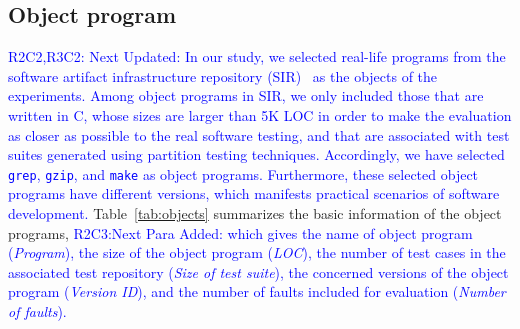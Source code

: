 \documentclass[10pt,journal,compsoc]{IEEEtran}
\begin{document}
\subsection{Object program}

\textcolor{blue}{R2C2,R3C2: Next Updated: In our study, we selected real-life programs from the software artifact infrastructure repository (SIR)~\cite{Do05} as the objects of the experiments. Among object programs in SIR, we only included those that are written in C, whose sizes are larger than 5K LOC in order to make the evaluation as closer as possible to the real software testing, and that are associated with test suites generated using partition testing techniques. Accordingly, we have selected \texttt{grep}, \texttt{gzip}, and \texttt{make} as object programs. Furthermore, these selected object programs have different versions, which manifests practical scenarios of software development.} Table~\ref{tab:objects} summarizes the basic information of the object programs, \textcolor{blue}{R2C3:Next Para Added: which gives the name of object program (\emph{Program}), the size of the object program (\emph{LOC}), the number of test cases in the associated test repository (\emph{Size of test suite}), the concerned versions of the object program (\emph{Version ID}), and the number of faults included for evaluation (\emph{Number of faults}).}
\end{document}
